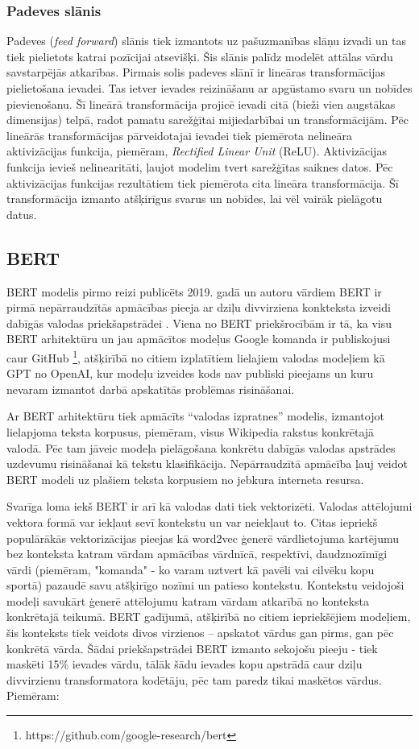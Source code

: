 \subsubsection{Padeves slānis}
Padeves (\textit{feed forward}) slānis tiek izmantots uz pašuzmanības slāņu izvadi un tas tiek pielietots katrai pozīcijai atsevišķi. Šis slānis palīdz modelēt attālas vārdu savstarpējās atkarības. Pirmais solis padeves slānī ir lineāras transformācijas pielietošana ievadei. Tas ietver ievades reizināšanu ar apgūstamo svaru un nobīdes pievienošanu. Šī lineārā transformācija projicē ievadi citā (bieži vien augstākas dimensijas) telpā, radot pamatu sarežģītai mijiedarbībai un transformācijām. Pēc lineārās transformācijas pārveidotajai ievadei tiek piemērota nelineāra aktivizācijas funkcija, piemēram, \textit{Rectified Linear Unit} (ReLU). Aktivizācijas funkcija ievieš nelinearitāti, ļaujot modelim tvert sarežģītas saiknes datos. Pēc aktivizācijas funkcijas rezultātiem tiek piemērota cita lineāra transformācija. Šī transformācija izmanto atšķirīgus svarus un nobīdes, lai vēl vairāk pielāgotu datus.

\subsection{BERT}
BERT modelis pirmo reizi publicēts 2019. gadā un autoru vārdiem BERT ir pirmā nepārraudzītās apmācības pieeja ar dziļu divvirziena konkteksta izveidi dabīgās valodas priekšapstrādei \cite{devlin2019bert}. Viena no BERT priekšrocībām ir tā, ka visu BERT arhitektūru un jau apmācītos modeļus Google komanda ir publiskojusi caur GitHub \footnote{https://github.com/google-research/bert}, atšķirībā no citiem izplatītiem lielajiem valodas modeļiem kā GPT no OpenAI, kur modeļu izveides kods nav publiski pieejams un kuru nevaram izmantot darbā apskatītās problēmas risināšanai.

Ar BERT arhitektūru tiek apmācīts “valodas izpratnes” modelis, izmantojot lielapjoma teksta korpusus, piemēram, visus Wikipedia rakstus konkrētajā valodā. Pēc tam jāveic modeļa pielāgošana konkrētu dabīgās valodas apstrādes uzdevumu risināšanai kā tekstu klasifikācija. Nepārraudzītā apmācība ļauj veidot BERT modeli uz plašiem teksta korpusiem no jebkura interneta resursa.

Svarīga loma iekš BERT ir arī kā valodas dati tiek vektorizēti. Valodas attēlojumi vektora formā var iekļaut sevī kontekstu un var neiekļaut to. Citas iepriekš populārākās vektorizācijas pieejas kā word2vec ģenerē vārdlietojuma kartējumu bez konteksta katram vārdam apmācības vārdnīcā, respektīvi, daudznozīmīgi vārdi (piemēram, "komanda" - ko varam uztvert kā pavēli vai cilvēku kopu sportā) pazaudē savu atšķirīgo nozīmi un patieso kontekstu. Kontekstu veidojoši modeļi savukārt ģenerē attēlojumu katram vārdam atkarībā no konteksta konkrētajā teikumā. BERT gadījumā, atšķirībā no citiem iepriekšējiem modeļiem, šis konteksts tiek veidots divos virzienos – apskatot vārdus gan pirms, gan pēc konkrētā vārda. Šādai priekšapstrādei BERT izmanto sekojošu pieeju -  tiek maskēti 15\% ievades vārdu, tālāk šādu ievades kopu apstrādā caur dziļu divvirzienu transformatora kodētāju, pēc tam paredz tikai maskētos vārdus. Piemēram:

